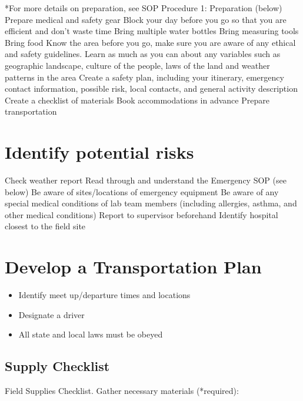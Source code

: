 \documentclass[12pt]{../SOP4_alpha}\usepackage[]{graphicx}\usepackage[]{color}
\begin{document}
*For more details on preparation, see SOP Procedure 1: Preparation (below)
Prepare medical and safety gear 
Block your day before you go so that you are efficient and don't waste time
Bring multiple water bottles
Bring measuring tools
Bring food
Know the area before you go, make sure you are aware of any ethical and safety guidelines. Learn as much as you can about any variables such as geographic landscape, culture of the people, laws of the land and weather patterns in the area
Create a safety plan, including your itinerary, emergency contact information, possible risk, local contacts, and general activity description 
Create a checklist of materials 
Book accommodations in advance
Prepare transportation

\section{Identify potential risks}


Check weather report
Read through and understand the Emergency SOP (see below)
Be aware of sites/locations of emergency equipment
Be aware of any special medical conditions of lab team members (including allergies, asthma, and other medical conditions)
Report to supervisor beforehand
Identify hospital closest to the field site


\section{Develop a Transportation Plan}

\begin{itemize}
  \item Identify meet up/departure times and locations
  \item Designate a driver
  \item All state and local laws must be obeyed
\end{itemize}

\subsection{Supply Checklist}

\NP Field Supplies Checklist. Gather necessary materials (*required):
\end{document}
